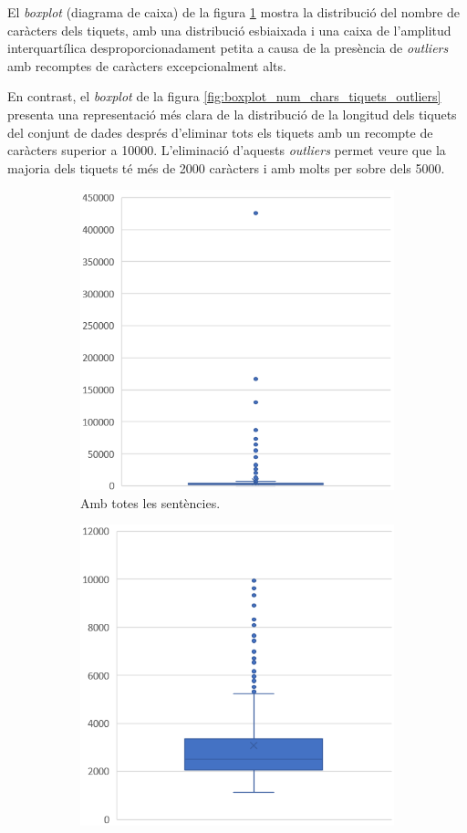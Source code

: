 El \textit{boxplot} (diagrama de caixa) de la figura \ref{fig:boxplot_num_chars_tiquets} mostra la distribució del nombre de caràcters dels tiquets, amb una distribució esbiaixada i una caixa de l'amplitud interquartílica desproporcionadament petita a causa de la presència de \textit{outliers} amb recomptes de caràcters excepcionalment alts.

En contrast, el \textit{boxplot} de la figura \ref{fig:boxplot_num_chars_tiquets_outliers} presenta una representació més clara de la distribució de la longitud dels tiquets del conjunt de dades després d'eliminar tots els tiquets amb un recompte de caràcters superior a 10000. L'eliminació d'aquests \textit{outliers} permet veure que la majoria dels tiquets té més de 2000 caràcters i amb molts per sobre dels 5000.

\begin{figure}[H]
    \centering
    \begin{subfigure}{.5\textwidth}
      \centering
      \includegraphics[width=.7\linewidth]{boxplot_num_chars_tiquets.png}
      \caption{Amb totes les sentències.}
      \label{fig:boxplot_num_chars_tiquets}
    \end{subfigure}%
    \begin{subfigure}{.5\textwidth}
      \centering
      \includegraphics[width=.7\linewidth]{boxplot_num_chars_tiquets_outliers.png}

\end{subfigure}
\end{figure}
